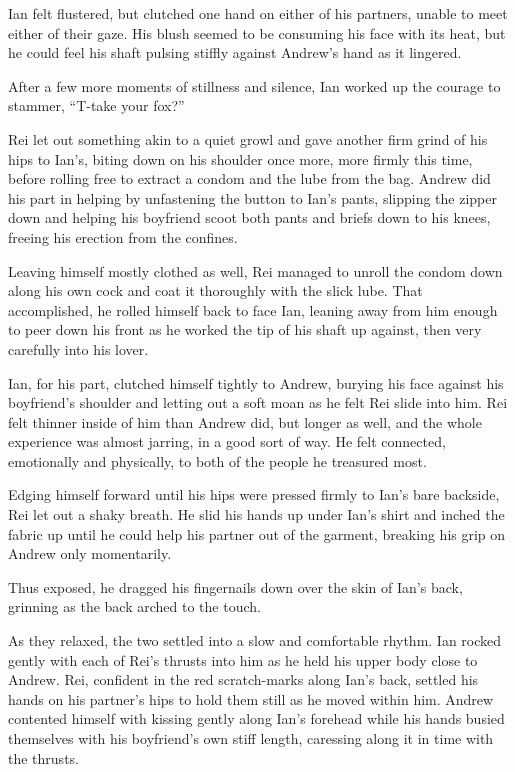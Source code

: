 \documentclass[12pt,letterpaper,oneside]{memoir}
\begin{document}
  Ian felt flustered, but clutched one hand on either of his partners, unable to meet either of their gaze. His blush seemed to be consuming his face with its heat, but he could feel his shaft pulsing stiffly against Andrew's hand as it lingered.

  After a few more moments of stillness and silence, Ian worked up the courage to stammer, ``T-take your fox?''

  Rei let out something akin to a quiet growl and gave another firm grind of his hips to Ian's, biting down on his shoulder once more, more firmly this time, before rolling free to extract a condom and the lube from the bag. Andrew did his part in helping by unfastening the button to Ian's pants, slipping the zipper down and helping his boyfriend scoot both pants and briefs down to his knees, freeing his erection from the confines.

  Leaving himself mostly clothed as well, Rei managed to unroll the condom down along his own cock and coat it thoroughly with the slick lube. That accomplished, he rolled himself back to face Ian, leaning away from him enough to peer down his front as he worked the tip of his shaft up against, then very carefully into his lover.

  Ian, for his part, clutched himself tightly to Andrew, burying his face against his boyfriend's shoulder and letting out a soft moan as he felt Rei slide into him. Rei felt thinner inside of him than Andrew did, but longer as well, and the whole experience was almost jarring, in a good sort of way. He felt connected, emotionally and physically, to both of the people he treasured most.

  Edging himself forward until his hips were pressed firmly to Ian's bare backside, Rei let out a shaky breath. He slid his hands up under Ian's shirt and inched the fabric up until he could help his partner out of the garment, breaking his grip on Andrew only momentarily.

  Thus exposed, he dragged his fingernails down over the skin of Ian's back, grinning as the back arched to the touch.

  As they relaxed, the two settled into a slow and comfortable rhythm. Ian rocked gently with each of Rei's thrusts into him as he held his upper body close to Andrew. Rei, confident in the red scratch-marks along Ian's back, settled his hands on his partner's hips to hold them still as he moved within him. Andrew contented himself with kissing gently along Ian's forehead while his hands busied themselves with his boyfriend's own stiff length, caressing along it in time with the thrusts.
\end{document}
